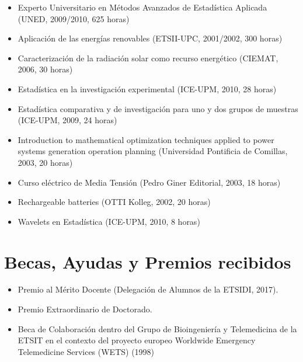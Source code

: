 \documentclass[article, a4paper]{memoir}
\begin{document}
\begin{itemize}
\item Experto Universitario en Métodos Avanzados de Estadística Aplicada (UNED, 2009/2010, 625 horas)

\item Aplicación de las energías renovables (ETSII-UPC, 2001/2002, 300 horas)

\item Caracterización de la radiación solar como recurso energético (CIEMAT, 2006, 30 horas)

\item Estadística en la investigación experimental (ICE-UPM, 2010, 28 horas)

\item Estadística comparativa y de investigación para uno y dos grupos de muestras (ICE-UPM, 2009, 24 horas)

\item Introduction to mathematical optimization techniques applied to power systems generation operation planning (Universidad Pontificia de Comillas, 2003, 20 horas)

\item Curso eléctrico de Media Tensión (Pedro Giner Editorial, 2003, 18 horas)

\item Rechargeable batteries (OTTI Kolleg, 2002, 20 horas)

\item Wavelets en Estadística (ICE-UPM, 2010, 8 horas)
\end{itemize}


\section{Becas, Ayudas y Premios recibidos}
\label{sec:orgb20c135}
\begin{itemize}
\item Premio al Mérito Docente (Delegación de Alumnos de la ETSIDI, 2017).
\item Premio Extraordinario de Doctorado.
\item Beca de Colaboración dentro del Grupo de Bioingeniería y Telemedicina de la ETSIT en el contexto del proyecto europeo \guillemotleft{}Worldwide Emergency Telemedicine Services\guillemotright{} (WETS) (1998)
\end{itemize}
\end{document}
